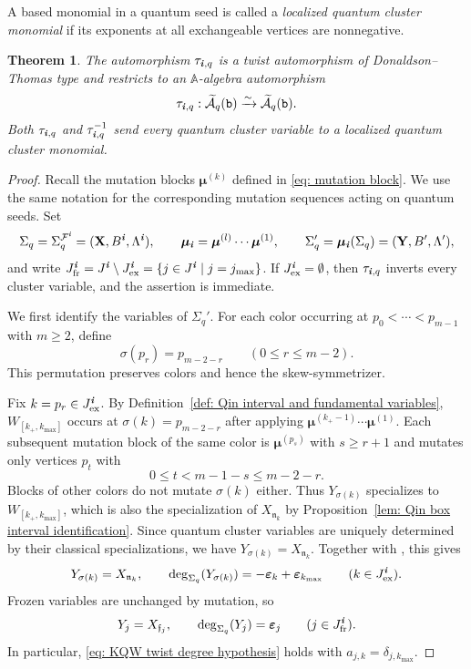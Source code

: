 \documentclass[12pt, leqno]{amsart}
\numberwithin{equation}{section}
\theoremstyle{plain}
\newtheorem{theorem}[lemma]{Theorem}
\theoremstyle{definition}
\renewcommand{\le}{\leqslant}
\renewcommand{\ge}{\geqslant}
\newcommand{\ex}{\mathrm{ex}}
\newcommand{\fr}{\mathrm{fr}}
\newcommand{\ve}{\boldsymbol{\varepsilon}}
\newcommand{\ii}{ \textbf{\textit{i}}}
\newcommand{\frakf}{\mathfrak{f}}
\newcommand{\frakn}{\mathfrak{n}}
\newcommand{\bbA}{\mathbb{A}}
\newcommand{\bmu}{{\boldsymbol{\mu}}}
\newcommand{\bfX}{\mathbf{X}}
\newcommand{\bfY}{\mathbf{Y}}
\newcommand{\calA}{\mathcal{A}}
\newcommand{\calF}{\mathcal{F}}
\newcommand{\tcalA}{\widetilde{\calA}}
\newcommand{\ttb}{\mathtt{b}}
\begin{document}
A based monomial in a quantum seed is called a
\emph{localized quantum cluster monomial} if its exponents at all
exchangeable vertices are nonnegative.

\begin{theorem}
\label{thm: arbitrary positive word DT twist}
The automorphism $\tau_{\ii,q}$ is a twist automorphism of
Donaldson--Thomas type and
restricts to an $\bbA$-algebra automorphism
\[
\tau_{\ii,q}:\tcalA_q(\ttb)
\xrightarrow{\sim}\tcalA_q(\ttb).
\]
Both $\tau_{\ii,q}$ and $\tau_{\ii,q}^{-1}$ send every quantum
cluster variable to a localized quantum cluster monomial.
\end{theorem}

\begin{proof} Recall the mutation blocks $\bmu^{(k)}$ defined in
\eqref{eq: mutation block}. We use the same notation for the
corresponding mutation sequences acting on quantum seeds. 
Set
\[
\Sigma_q=\Sigma_q^{\calF^\ii}=(\bfX,B^\ii,\Lambda^\ii),
\qquad
\bmu_\ii=\bmu^{(l)}\cdots\bmu^{(1)},
\qquad
\Sigma_q'=\bmu_\ii(\Sigma_q)=(\bfY,B',\Lambda'),
\]
and write
$J^\ii_{\fr}=J^\ii\setminus J^\ii_\ex
=\{j\in J^\ii\mid j=j_{\max}\}$.
If $J^\ii_\ex=\emptyset$, then $\tau_{\ii,q}$ inverts every
cluster variable, and the assertion is immediate.

We first identify the variables of $\Sigma_q'$.
For each color occurring at $p_0<\cdots<p_{m-1}$ with $m\ge2$,
define
\begin{equation}
\sigma(p_r)=p_{m-2-r}\qquad(0\le r\le m-2).
\label{eq: arbitrary word terminal permutation}
\end{equation}
This permutation preserves colors and hence the skew-symmetrizer.

Fix $k=p_r\in J^\ii_\ex$.
By Definition~\ref{def: Qin interval and fundamental variables},
$W_{[k_+,k_{\max}]}$ occurs at $\sigma(k)=p_{m-2-r}$
 after applying $\bmu^{(k_+-1)}\cdots\bmu^{(1)}$.  
Each subsequent mutation block of the same color is $\bmu^{(p_s)}$
with $s\ge r+1$ and mutates only vertices $p_t$ with
\[
0\le t<m-1-s\le m-2-r.
\]
Blocks of other colors do not mutate $\sigma(k)$ either.
Thus $Y_{\sigma(k)}$ specializes to $W_{[k_+,k_{\max}]}$,
which is also the specialization of $X_{\frakn_k}$ by
Proposition~\ref{lem: Qin box interval identification}.
Since quantum cluster variables are uniquely determined by
their classical specializations, we have
$Y_{\sigma(k)}=X_{\frakn_k}$.
Together with \cite[Proposition~8.7]{Qin24A}, this gives
\begin{equation}
Y_{\sigma(k)}=X_{\frakn_k},
\qquad
\deg_{\Sigma_q}(Y_{\sigma(k)})
=-\ve_k+\ve_{k_{\max}}
\qquad(k\in J^\ii_\ex).
\label{eq: terminal suffix box arbitrary word}
\end{equation}
Frozen variables are unchanged by mutation, so
\begin{equation}
Y_j=X_{\frakf_j},
\qquad
\deg_{\Sigma_q}(Y_j)=\ve_j
\qquad(j\in J^\ii_{\fr}).
\label{eq: terminal frozen box arbitrary word}
\end{equation}
In particular, \eqref{eq: KQW twist degree hypothesis} holds
with $a_{j,k}=\delta_{j,k_{\max}}$.


\end{proof}
\end{document}
